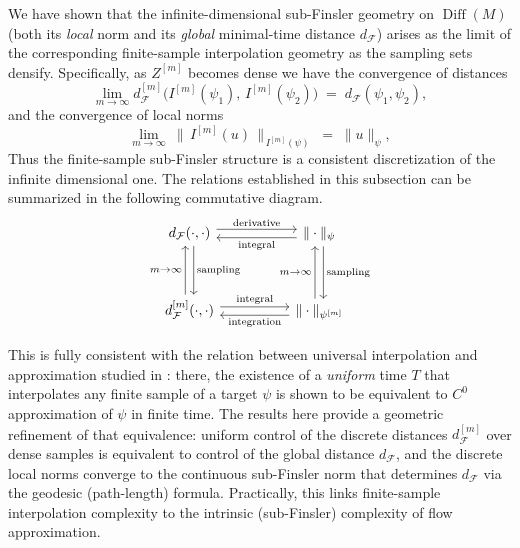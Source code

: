 \documentclass[12pt]{amsart}
\numberwithin{equation}{section}
\theoremstyle{remark}
\begin{document}
We have shown that the infinite-dimensional sub-Finsler geometry on $\operatorname{Diff}(M)$
(both its \emph{local} norm and its \emph{global} minimal-time distance $d_{\mathcal F}$)
arises as the limit of the corresponding finite-sample interpolation geometry as the sampling sets densify.
Specifically, as $Z^{[m]}$ becomes dense we have the convergence of distances
\begin{equation}
\lim_{m\to\infty} d_{\mathcal F}^{[m]}\!\big(I^{[m]}(\psi_1),\,I^{[m]}(\psi_2)\big)
\;=\; d_{\mathcal F}(\psi_1,\psi_2),
\end{equation}
and the convergence of local norms
\begin{equation}
\lim_{m\to\infty}\ \big\|\, I^{[m]}(u)\,\big\|_{\,I^{[m]}(\psi)}
\;=\; \|u\|_{\psi},
\end{equation}
Thus the finite-sample sub-Finsler structure is a consistent discretization of the infinite dimensional one.
The relations established in this subsection can be summarized in the following commutative diagram.
\begin{equation}
\begin{tikzcd}[row sep=3.5em, column sep=5em]
d_{\mathcal F}(\cdot, \cdot)
  \arrow[r, shift left=0.7ex, "\text{derivative}"]
  \arrow[d, shift left=0.7ex, "\text{sampling}"]
&
\|\cdot \|_{\psi}
  \arrow[l, shift left=0.7ex, "\text{integral}"]
  \arrow[d, shift left=0.7ex, "\text{sampling}"]
\\
d_{\mathcal F}^{[m]}(\cdot, \cdot)
  \arrow[u, shift left=0.7ex, "m\to \infty"]
  \arrow[r, shift left=0.7ex, "\text{integral}"]
&
\|\cdot \|_{\psi^{[m]}}
  \arrow[l, shift left=0.7ex, "\text{integration}"]
  \arrow[u, shift left=0.7ex, "m\to \infty"]
\end{tikzcd}
\end{equation}

This is fully consistent with the relation between universal interpolation and approximation studied in \cite{cheng2025interpolation}:
there, the existence of a \emph{uniform} time $T$ that interpolates any finite sample of a target $\psi$ is shown to be equivalent to $C^0$ approximation of $\psi$ in finite time.
The results here provide a geometric refinement of that equivalence:
uniform control of the discrete distances $d_{\mathcal F}^{[m]}$ over dense samples is equivalent to control of the global distance $d_{\mathcal F}$, and the discrete local norms converge to the continuous sub-Finsler norm that determines $d_{\mathcal F}$ via the geodesic (path-length) formula.
Practically, this links finite-sample interpolation complexity to the intrinsic (sub-Finsler) complexity of flow approximation.
\end{document}
